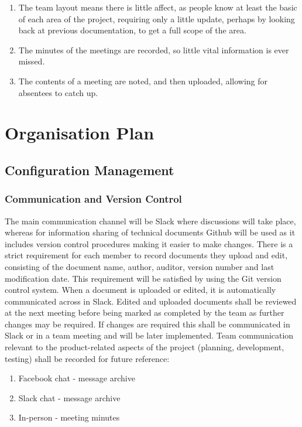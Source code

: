 \documentclass[11pt]{article}
\begin{document}
\begin{enumerate}
\item The team layout means there is little affect, as people know at least the basic of each area of the project, requiring only a little update, perhaps by looking back at previous documentation, to get a full scope of the area. 
\item The minutes of the meetings are recorded, so little vital information is ever missed.
\item The contents of a meeting are noted, and then uploaded, allowing for absentees to catch up.
\end{enumerate}

\newpage
\section{Organisation Plan}

\subsection{Configuration Management}

\subsubsection{Communication and Version Control}

The main communication channel will be Slack where discussions will take place, whereas for information sharing of technical documents Github will be used as it includes version control procedures making it easier to make changes. There is a strict requirement for each member to record documents they upload and edit, consisting of the document name, author, auditor, version number and last modification date. This requirement will be satisfied by using the Git version control system. When a document is uploaded or edited, it is automatically communicated across in Slack. Edited and uploaded documents shall be reviewed at the next meeting before being marked as completed by the team as further changes may be required. If changes are required this shall be communicated in Slack or in a team meeting and will be later implemented. Team communication relevant to the product-related aspects of the project (planning, development, testing) shall be recorded for future reference:
\begin{enumerate}
\item Facebook chat - message archive
\item Slack chat - message archive
\item In-person - meeting minutes
\end{enumerate}
\end{document}
